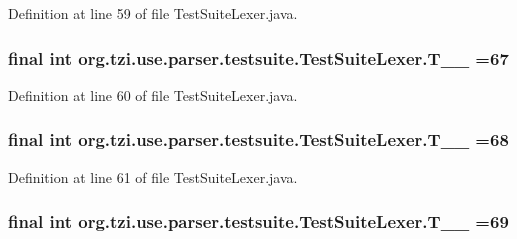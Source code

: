 Definition at line 59 of file Test\-Suite\-Lexer.\-java.

\hypertarget{classorg_1_1tzi_1_1use_1_1parser_1_1testsuite_1_1_test_suite_lexer_ac0964a19ce641056e6423760305eb2c3}{
\subsubsection[{T\-\_\-\-\_\-67}]{\setlength{\rightskip}{0pt plus 5cm}final int org.\-tzi.\-use.\-parser.\-testsuite.\-Test\-Suite\-Lexer.\-T\-\_\-\-\_ =67\hspace{0.3cm}{\ttfamily [static]}}}\label{classorg_1_1tzi_1_1use_1_1parser_1_1testsuite_1_1_test_suite_lexer_ac0964a19ce641056e6423760305eb2c3}


Definition at line 60 of file Test\-Suite\-Lexer.\-java.

\hypertarget{classorg_1_1tzi_1_1use_1_1parser_1_1testsuite_1_1_test_suite_lexer_a54f160fe626d49bb84211dbd3c571093}{
\subsubsection[{T\-\_\-\-\_\-68}]{\setlength{\rightskip}{0pt plus 5cm}final int org.\-tzi.\-use.\-parser.\-testsuite.\-Test\-Suite\-Lexer.\-T\-\_\-\-\_ =68\hspace{0.3cm}{\ttfamily [static]}}}\label{classorg_1_1tzi_1_1use_1_1parser_1_1testsuite_1_1_test_suite_lexer_a54f160fe626d49bb84211dbd3c571093}


Definition at line 61 of file Test\-Suite\-Lexer.\-java.

\hypertarget{classorg_1_1tzi_1_1use_1_1parser_1_1testsuite_1_1_test_suite_lexer_ad60e6f6ecc2ddd68dd4aabab09df75c5}{
\subsubsection[{T\-\_\-\-\_\-69}]{\setlength{\rightskip}{0pt plus 5cm}final int org.\-tzi.\-use.\-parser.\-testsuite.\-Test\-Suite\-Lexer.\-T\-\_\-\-\_ =69\hspace{0.3cm}{\ttfamily [static]}}}\label{classorg_1_1tzi_1_1use_1_1parser_1_1testsuite_1_1_test_suite_lexer_ad60e6f6ecc2ddd68dd4aabab09df75c5}


